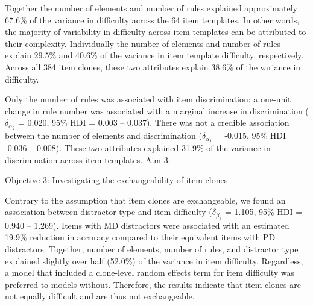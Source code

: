 \documentclass[a4paper,man,natbib]{apa6}
\makeatletter
\renewcommand{\subsubsection}{\@startsection{subsubsection}{3}
  {\z@}%
  {\b@level@two@skip}{\e@level@two@skip}%
  {\normalfont\normalsize\bfseries}}
\makeatother
\begin{document}
Together the number of elements and number of rules explained approximately 67.6\% of the variance in difficulty across the 64 item templates. In other words, the majority of variability in difficulty across item templates can be attributed to their complexity. Individually the number of elements and number of rules explain 29.5\% and 40.6\% of the variance in item template difficulty, respectively. Across all 384 item clones, these two attributes explain 38.6\% of the variance in difficulty.

Only the number of rules was associated with item discrimination: a one-unit change in rule number was associated with a marginal increase in discrimination ($\delta_{\alpha_2}$ = 0.020, 95\% HDI = 0.003 -- 0.037). There was not a credible association between the number of elements and discrimination ($\delta_{\alpha_1}$ = -0.015, 95\% HDI = -0.036 -- 0.008). These two attributes explained 31.9\% of the variance in discrimination across item templates. 
\subsubsection{Aim 3:}

\subsubsection{Objective 3: Investigating the exchangeability of item clones}

Contrary to the assumption that item clones are exchangeable, we found an association between distractor type and item difficulty ($\delta_{\beta_3}$ = 1.105, 95\% HDI = 0.940 -- 1.269). Items with MD distractors were associated with an estimated 19.9\% reduction in accuracy compared to their equivalent items with PD distractors. Together, number of elements, number of rules, and distractor type explained slightly over half (52.0\%) of the variance in item difficulty. Regardless, a model that included a clone-level random effects term for item difficulty was preferred to models without. Therefore, the results indicate that item clones are not equally difficult and are thus not exchangeable. 
\end{document}

